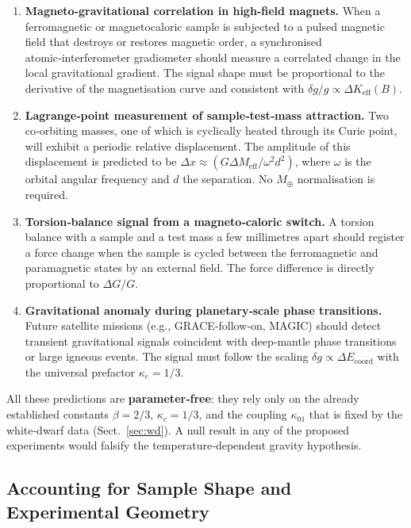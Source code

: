 \documentclass[12pt]{article}
\theoremstyle{remark}
\begin{document}
	\begin{enumerate}
		\item \textbf{Magneto‑gravitational correlation in high‑field magnets.}
		When a ferromagnetic or magnetocaloric sample is subjected to a pulsed magnetic field
		that destroys or restores magnetic order, a synchronised atomic‑interferometer
		gradiometer should measure a correlated change in the local gravitational gradient.
		The signal shape must be proportional to the derivative of the magnetisation curve
		and consistent with $\delta g/g \propto \Delta K_{\mathrm{eff}}(B)$.
		\item \textbf{Lagrange‑point measurement of sample‑test‑mass attraction.}
		Two co‑orbiting masses, one of which is cyclically heated through its Curie point,
		will exhibit a periodic relative displacement.  The amplitude of this displacement is
		predicted to be $\Delta x \approx (G \Delta M_{\mathrm{eff}} / \omega^2 d^2)$, where
		$\omega$ is the orbital angular frequency and $d$ the separation.  No $M_\oplus$
		normalisation is required.
		\item \textbf{Torsion‑balance signal from a magneto‑caloric switch.}
		A torsion balance with a sample and a test mass a few millimetres apart should
		register a force change when the sample is cycled between the ferromagnetic and
		paramagnetic states by an external field.  The force difference is directly
		proportional to $\Delta G/G$.
		\item \textbf{Gravitational anomaly during planetary‑scale phase transitions.}
		Future satellite missions (e.g., GRACE‑follow‑on, MAGIC) should detect transient
		gravitational signals coincident with deep‑mantle phase transitions or large igneous
		events.  The signal must follow the scaling $\delta g \propto \Delta E_{\mathrm{coord}}$
		with the universal prefactor $\kappa_c = 1/3$.
	\end{enumerate}
	
	All these predictions are \textbf{parameter‑free}: they rely only on the already
	established constants $\beta = 2/3$, $\kappa_c = 1/3$, and the coupling $\kappa_{01}$
	that is fixed by the white‑dwarf data (Sect.~\ref{sec:wd}).  A null result in any of
	the proposed experiments would falsify the temperature‑dependent gravity hypothesis.
	
	
	\subsection{Accounting for Sample Shape and Experimental Geometry}
	\label{subsec:lab-geometry}
	
\end{document}
